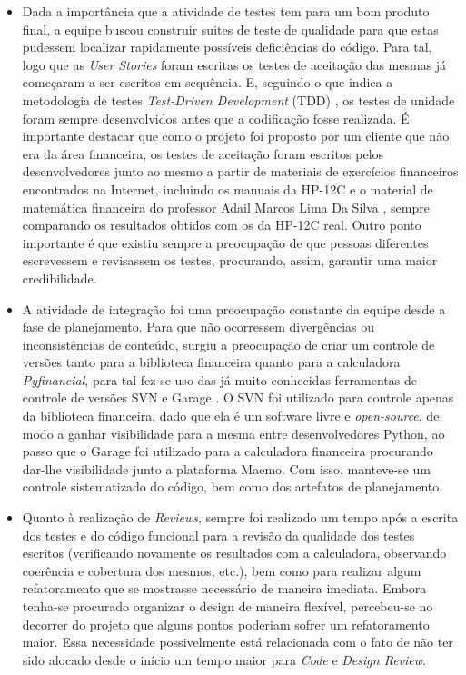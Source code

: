 \begin{itemize}
 \item Dada a importância que a atividade de testes tem para um bom produto final, a equipe buscou construir suites de teste de qualidade para que estas pudessem localizar rapidamente possíveis deficiências do código. Para tal, logo que as \textit{User Stories} foram escritas os testes de aceitação das mesmas já começaram a ser escritos em sequência. E, seguindo o que indica a metodologia de testes \textit{Test-Driven Development} (TDD) \cite{TDD}, os testes de unidade foram sempre desenvolvidos antes que a codificação fosse realizada. É importante destacar que como o projeto foi proposto por um cliente que não era da área financeira, os testes de aceitação foram escritos pelos desenvolvedores junto ao mesmo a partir de materiais de exercícios financeiros encontrados na Internet, incluindo os manuais da HP-12C \cite{man1} \cite{man2} \cite{man3} \cite{man4} e o material de matemática financeira do professor Adail Marcos Lima Da Silva \cite{adail}, sempre comparando os resultados obtidos com os da HP-12C real. Outro ponto importante é que existiu sempre a preocupação de que pessoas diferentes escrevessem e revisassem os testes, procurando, assim, garantir uma maior credibilidade.

 \item A atividade de integração foi uma preocupação constante da equipe desde a fase de planejamento. Para que não ocorressem divergências ou inconsistências de conteúdo, surgiu a preocupação de criar um controle de versões tanto para a biblioteca financeira quanto para a calculadora \textit{Pyfinancial}, para tal fez-se uso das já muito conhecidas ferramentas de controle de versões SVN \cite{SVN} e Garage \cite{garage}. O SVN foi utilizado para controle apenas da biblioteca financeira, dado que ela é um software livre e \textit{open-source}, de modo a ganhar visibilidade para a mesma entre desenvolvedores Python, ao passo que o Garage foi utilizado para a calculadora financeira procurando dar-lhe visibilidade junto a plataforma Maemo. Com isso, manteve-se um controle sistematizado do código, bem como dos artefatos de planejamento.

 \item Quanto à realização de \textit{Reviews}, sempre foi realizado um tempo após a escrita dos testes e do código funcional para a revisão da qualidade dos testes escritos (verificando novamente os resultados com a calculadora, observando coerência e cobertura dos mesmos, etc.), bem como para realizar algum refatoramento que se mostrasse necessário de maneira imediata. Embora tenha-se procurado organizar o design de maneira flexível, percebeu-se no decorrer do projeto que alguns pontos poderiam sofrer um refatoramento maior. Essa necessidade possivelmente está relacionada com o fato de não ter sido alocado desde o início um tempo maior para \textit{Code} e \textit{Design Review}.


\end{itemize}
